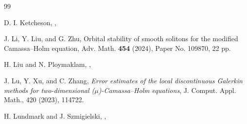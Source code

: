 \documentclass[11pt]{article}
\numberwithin{equation}{section}
\begin{document}
\begin{thebibliography}{99}


D. I. Ketcheson,
,







J. Li, Y. Liu, and G. Zhu, Orbital stability of smooth solitons for the modified Camassa--Holm equation, Adv. Math. {\bf 454} (2024), Paper No. 109870, 22 pp.

H. Liu and N. Ploymaklam,
,



J. Lu, Y. Xu, and C. Zhang, {\em Error estimates of the local discontinuous Galerkin methods for two-dimensional ($\mu$)-Camassa–Holm equations}, J. Comput. Appl. Math., 420 (2023), 114722.


 H. Lundmark and J. Szmigielski,
 ,


\end{thebibliography}
\end{document}

